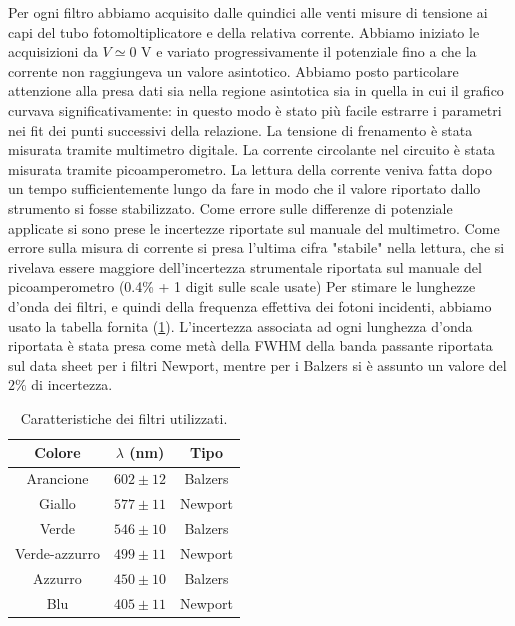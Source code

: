 \documentclass[10pt,a4paper]{article}
\begin{document}
Per ogni filtro abbiamo acquisito dalle quindici alle venti misure di tensione ai capi del tubo fotomoltiplicatore e della relativa corrente.
Abbiamo iniziato le acquisizioni da $V\simeq 0$ V e variato progressivamente il potenziale fino a che la corrente non raggiungeva un valore asintotico. Abbiamo posto particolare attenzione alla presa dati sia nella regione asintotica sia in quella in cui il grafico curvava significativamente: in questo modo è stato più facile estrarre i parametri nei fit dei punti successivi della relazione.
La tensione di frenamento è stata misurata tramite multimetro digitale. La corrente circolante nel circuito è stata misurata tramite picoamperometro.
La lettura della corrente veniva fatta dopo un tempo sufficientemente lungo da fare in modo che il valore riportato dallo strumento si fosse stabilizzato. %
Come errore sulle differenze di potenziale applicate si sono prese le incertezze riportate sul manuale del multimetro.
Come errore sulla misura di corrente si  presa l'ultima cifra "stabile" nella lettura, che si rivelava essere maggiore dell'incertezza strumentale riportata sul manuale del picoamperometro (0.4\% + 1 digit sulle scale usate) %
Per stimare le lunghezze d'onda dei filtri, e quindi della frequenza effettiva dei fotoni incidenti, abbiamo usato la tabella fornita (\ref{tab:filtri}).
L'incertezza associata ad ogni lunghezza d'onda riportata è stata presa come metà della FWHM della banda passante riportata sul data sheet per i filtri Newport, mentre per i Balzers si è assunto un valore del $2\%$ di incertezza. 

\begin{table}[!htb]
\begin{center}
\begin{tabular}{|c|c|c|}
\hline 
Colore & $\lambda$ (nm) & Tipo \\ 
\hline 
Arancione & $602\pm  12$  & Balzers\\ 
\hline 
Giallo & $577\pm 11$ & Newport\\ 
\hline 
Verde & $546\pm 10$ & Balzers\\ 
\hline 
Verde-azzurro & $499 \pm 11$ & Newport\\ 
\hline 
Azzurro & $ 450\pm 10$ & Balzers \\ 
\hline
Blu & $405\pm 11 $ & Newport\\ 
\hline
\end{tabular} 
\caption{Caratteristiche dei filtri utilizzati. \label{tab:filtri}}
\end{center}
\end{table}
\end{document}
